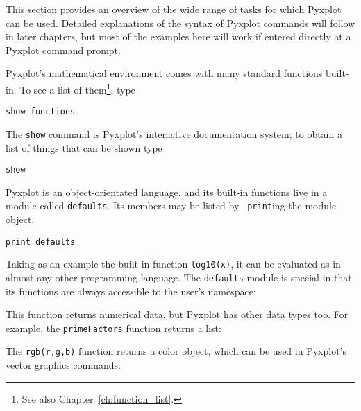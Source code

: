 This section provides an overview of the wide range of tasks for which Pyxplot
can be used. Detailed explanations of the syntax of Pyxplot commands will
follow in later chapters, but most of the examples here will work if entered
directly at a Pyxplot command prompt.


Pyxplot's mathematical environment comes with many standard functions built-in.
To see a list of them\footnote{See also Chapter~\ref{ch:function_list}.}, type

\begin{verbatim}
show functions
\end{verbatim}

The {\tt show} command is Pyxplot's interactive documentation system; to obtain
a list of things that can be shown type

\begin{verbatim}
show
\end{verbatim}

\noindent Pyxplot is an object-orientated language, and its built-in functions
live in a module called {\tt defaults}.  Its members may be listed by {\tt
print}ing the module object. 

\begin{verbatim}
print defaults
\end{verbatim}

Taking as an example the built-in function {\tt log10(x)}, it can be evaluated
as in almost any other programming language. The {\tt defaults} module
is special in that its functions are always accessible to the user's namespace:

\vspace{3mm}

\vspace{3mm}

\noindent This function returns numerical data, but Pyxplot has other data
types too.  For example, the {\tt primeFactors} function returns a list:

\vspace{3mm}

\vspace{3mm}

\noindent The {\tt rgb(r,g,b)} function returns a color object, which can be
used in Pyxplot's vector graphics commands:

\vspace{3mm}

\vspace{3mm}

